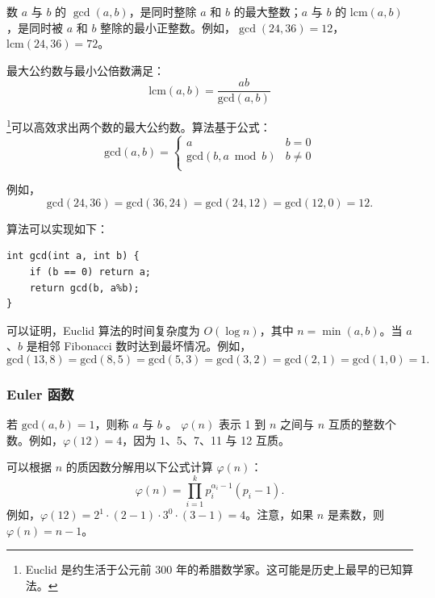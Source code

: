 
数 $a$ 与 $b$ 的 $\gcd(a,b)$，是同时整除 $a$ 和 $b$ 的最大整数；$a$ 与 $b$ 的 $\textrm{lcm}(a,b)$，是同时被 $a$ 和 $b$ 整除的最小正整数。例如，$\gcd(24,36)=12$，$\textrm{lcm}(24,36)=72$。

最大公约数与最小公倍数满足：
\[\textrm{lcm}(a,b)=\frac{ab}{\textrm{gcd}(a,b)}\]

\footnote{Euclid 是约生活于公元前 300 年的希腊数学家。这可能是历史上最早的已知算法。}可以高效求出两个数的最大公约数。算法基于公式：
\begin{equation*}
    \textrm{gcd}(a,b) = \begin{cases}
               a        & b = 0\\
               \textrm{gcd}(b,a \bmod b) & b \neq 0\\
           \end{cases}
\end{equation*}

例如，
\[\textrm{gcd}(24,36) = \textrm{gcd}(36,24)
= \textrm{gcd}(24,12) = \textrm{gcd}(12,0)=12.\]

算法可以实现如下：
\begin{lstlisting}
int gcd(int a, int b) {
    if (b == 0) return a;
    return gcd(b, a%b);
}
\end{lstlisting}

可以证明，Euclid 算法的时间复杂度为 $O(\log n)$，其中 $n=\min(a,b)$。当 $a$、$b$ 是相邻 Fibonacci 数时达到最坏情况。例如，
\[\textrm{gcd}(13,8)=\textrm{gcd}(8,5)
=\textrm{gcd}(5,3)=\textrm{gcd}(3,2)=\textrm{gcd}(2,1)=\textrm{gcd}(1,0)=1.\]

\subsubsection{Euler 函数}


若 $\textrm{gcd}(a,b)=1$，则称 $a$ 与 $b$ 。 $\varphi(n)$
表示 1 到 $n$ 之间与 $n$ 互质的整数个数。例如，$\varphi(12)=4$，因为 1、5、7、11 与 12 互质。

可以根据 $n$ 的质因数分解用以下公式计算 $\varphi(n)$：
\[ \varphi(n) = \prod_{i=1}^k p_i^{\alpha_i-1}(p_i-1). \]
例如，$\varphi(12)=2^1 \cdot (2-1) \cdot 3^0 \cdot (3-1)=4$。注意，如果 $n$ 是素数，则 $\varphi(n)=n-1$。

